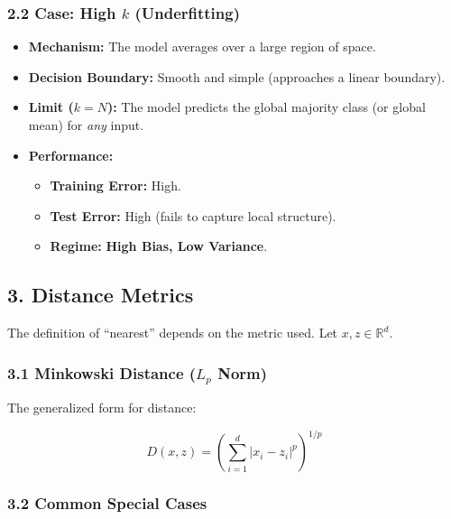 \documentclass[
  italian,
  11pt,
]{article}
\begin{document}
\subsubsection{\texorpdfstring{2.2 Case: High \(k\)
(Underfitting)}{2.2 Case: High k (Underfitting)}}\label{case-high-k-underfitting}

\begin{itemize}
\item
  \textbf{Mechanism:} The model averages over a large region of space.
\item
  \textbf{Decision Boundary:} Smooth and simple (approaches a linear
  boundary).
\item
  \textbf{Limit (\(k=N\)):} The model predicts the global majority class
  (or global mean) for \emph{any} input.
\item
  \textbf{Performance:}

  \begin{itemize}
  \item
    \textbf{Training Error:} High.
  \item
    \textbf{Test Error:} High (fails to capture local structure).
  \item
    \textbf{Regime:} \textbf{High Bias, Low Variance}.
  \end{itemize}
\end{itemize}

\subsection{3. Distance Metrics}\label{distance-metrics}

The definition of ``nearest'' depends on the metric used. Let
\(x, z \in \mathbb{R}^d\).

\subsubsection{\texorpdfstring{3.1 Minkowski Distance (\(L_p\)
Norm)}{3.1 Minkowski Distance (L\_p Norm)}}\label{minkowski-distance-l_p-norm}

The generalized form for distance:

\[D(x, z) = \left( \sum_{i=1}^d |x_i - z_i|^p \right)^{1/p}\]

\subsubsection{3.2 Common Special Cases}\label{common-special-cases}
\end{document}
